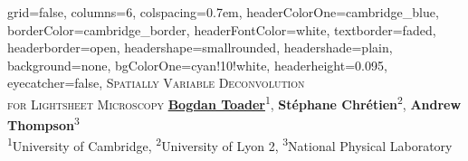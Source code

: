 \documentclass[a0paper,portrait,fontscale=0.35]{baposter}
\theoremstyle{plain}
\theoremstyle{plain}
\theoremstyle{definition}
\theoremstyle{plain}
\theoremstyle{definition}
\begin{document}

\begin{poster}
{
    grid=false,
    columns=6,
    colspacing=0.7em,
    headerColorOne=cambridge_blue,
    borderColor=cambridge_border,
    headerFontColor=white,
    textborder=faded,
    headerborder=open,
    headershape=smallrounded,
    headershade=plain,
    background=none,
    bgColorOne=cyan!10!white,
    headerheight=0.095\textheight,
    eyecatcher=false,
}
{
}
{
  \textsc{Spatially Variable Deconvolution\vspace{0.2cm}\\ 
    for Lightsheet Microscopy\vspace{0.2em}}
  \vspace{0.3em}
}
{
  \vspace{0.1em}
  \hspace{-0.65em}
  {
    \underline{\textbf{Bogdan Toader}}\textsuperscript{1},
    \textbf{St\'{e}phane Chr\'{e}tien}\textsuperscript{2}, 
    \textbf{Andrew Thompson}\textsuperscript{3}
  } \\[0.2em]
  {
    \textsuperscript{1}University of Cambridge,
    \textsuperscript{2}University of Lyon 2, 
    \textsuperscript{3}National Physical Laboratory
  }
}

\end{poster}
\end{document}
